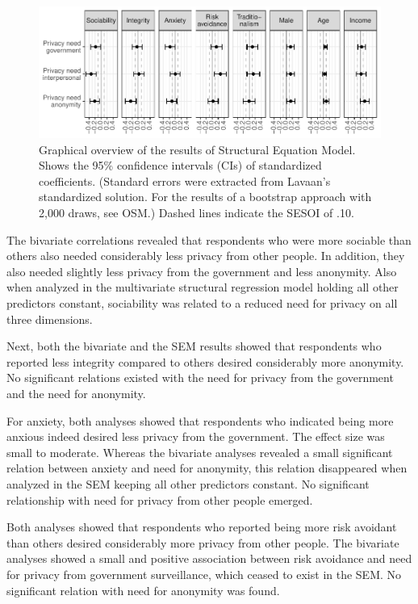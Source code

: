 \documentclass[man,floatsintext]{apa6}
\begin{document}
\begin{figure}
\centering
\includegraphics{manuscript_files/figure-latex/sem-fig-1.pdf}
\caption{\label{fig:sem-fig}Graphical overview of the results of Structural Equation Model. Shows the 95\% confidence intervals (CIs) of standardized coefficients. (Standard errors were extracted from Lavaan's standardized solution. For the results of a bootstrap approach with 2,000 draws, see OSM.) Dashed lines indicate the SESOI of \textbar{}.10\textbar{}.}
\end{figure}

The bivariate correlations revealed that respondents who were more sociable than others also needed considerably less privacy from other people. In addition, they also needed slightly less privacy from the government and less anonymity. Also when analyzed in the multivariate structural regression model holding all other predictors constant, sociability was related to a reduced need for privacy on all three dimensions.

Next, both the bivariate and the SEM results showed that respondents who reported less integrity compared to others desired considerably more anonymity. No significant relations existed with the need for privacy from the government and the need for anonymity.

For anxiety, both analyses showed that respondents who indicated being more anxious indeed desired less privacy from the government. The effect size was small to moderate. Whereas the bivariate analyses revealed a small significant relation between anxiety and need for anonymity, this relation disappeared when analyzed in the SEM keeping all other predictors constant. No significant relationship with need for privacy from other people emerged.

Both analyses showed that respondents who reported being more risk avoidant than others desired considerably more privacy from other people. The bivariate analyses showed a small and positive association between risk avoidance and need for privacy from government surveillance, which ceased to exist in the SEM. No significant relation with need for anonymity was found.
\end{document}
